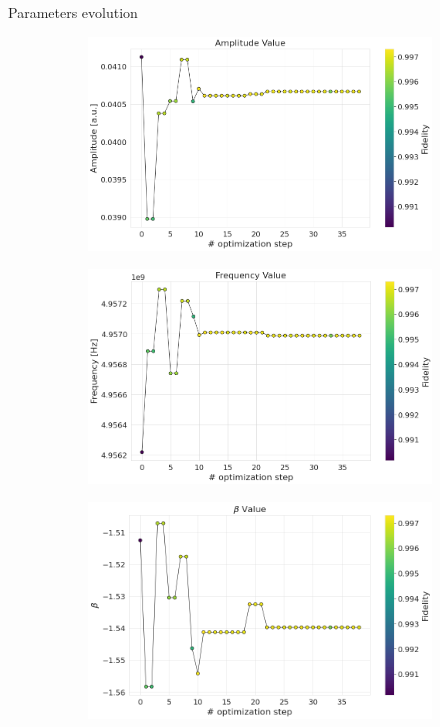 \documentclass[aspectratio=169,10pt]{beamer}
\begin{document}
\begin{frame}[t,fragile]{Parameters evolution}
  \begin{figure}
    \begin{subfigure}[t]{0.315\textwidth}
      \includegraphics[width=\textwidth]{figures/amplitude.png}
    \end{subfigure}
        \begin{subfigure}[t]{0.315\textwidth}
      \includegraphics[width=\textwidth]{figures/frequency.png}
    \end{subfigure}
        \begin{subfigure}[t]{0.315\textwidth}
      \includegraphics[width=\textwidth]{figures/beta.png}
    \end{subfigure}


\end{figure}
\end{frame}
\end{document}
